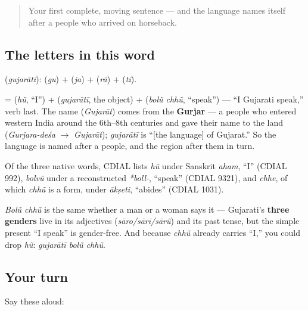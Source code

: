 \begin{quote}
Your first complete, moving sentence — and the language names itself after a people who arrived on horseback.
\end{quote}

\subsection*{The letters in this word}
\textbf{} (\emph{gujarātī}): \textbf{} (\emph{gu}) + \textbf{} (\emph{ja}) + \textbf{} (\emph{rā}) + \textbf{} (\emph{tī}).

\begin{cousinweb}
\textbf{   } = \textbf{} (\emph{hũ}, \textquotedblleft{}I\textquotedblright{}) + \textbf{} (\emph{gujarātī}, the object) + \textbf{ } (\emph{bolũ chhũ}, \textquotedblleft{}speak\textquotedblright{}) — \textquotedblleft{}I Gujarati speak,\textquotedblright{} verb last. The name \textbf{} (\emph{Gujarāt}) comes from the \textbf{Gurjar} — a people who entered western India around the 6th–8th centuries and gave their name to the land (\emph{Gurjara-deśa} $\to$ \emph{Gujarāt}); \emph{gujarātī} is \textquotedblleft{}{[}the language{]} of Gujarat.\textquotedblright{} So the language is named after a people, and the region after them in turn.

Of the three native words, CDIAL lists \emph{hũ} under Sanskrit \emph{aham}, \textquotedblleft{}I\textquotedblright{} (CDIAL 992), \emph{bolvũ} under a reconstructed \emph{*boll-}, \textquotedblleft{}speak\textquotedblright{} (CDIAL 9321), and \emph{chhe}, of which \emph{chhũ} is a form, under \emph{ākṣeti}, \textquotedblleft{}abides\textquotedblright{} (CDIAL 1031).
\end{cousinweb}

\begin{grammarlens}[title={Grammar Lens: no gender in the plain present}]
\emph{Bolũ chhũ} is the same whether a man or a woman says it — Gujarati's \textbf{three genders} live in its adjectives (\emph{sāro/sārī/sārũ}) and its past tense, but the simple present \textquotedblleft{}I speak\textquotedblright{} is gender-free. And because \emph{chhũ} already carries \textquotedblleft{}I,\textquotedblright{} you could drop \emph{hũ}: \emph{gujarātī bolũ chhũ}.
\end{grammarlens}

\subsection*{Your turn}
Say these aloud:

